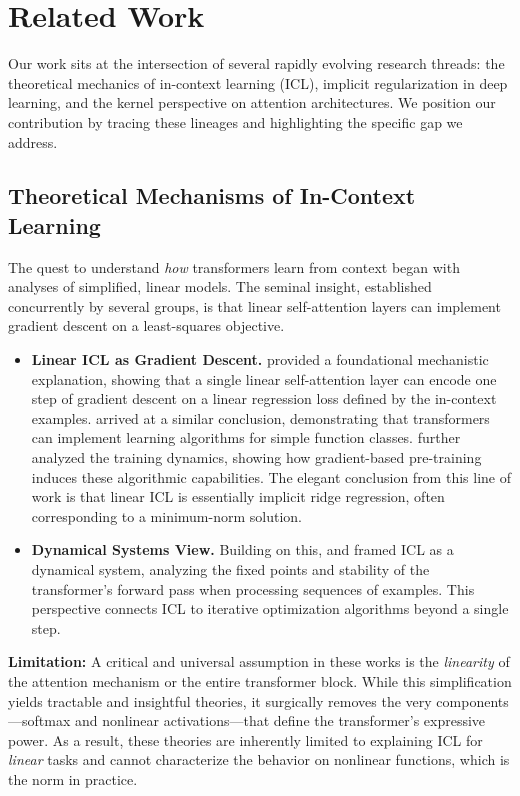 \section{Related Work}
\label{sec:related-work}

Our work sits at the intersection of several rapidly evolving research threads: the theoretical mechanics of in-context learning (ICL), implicit regularization in deep learning, and the kernel perspective on attention architectures. We position our contribution by tracing these lineages and highlighting the specific gap we address.

\subsection{Theoretical Mechanisms of In-Context Learning}
\label{subsec:theory-icl}

The quest to understand \textit{how} transformers learn from context began with analyses of simplified, linear models. The seminal insight, established concurrently by several groups, is that linear self-attention layers can implement gradient descent on a least-squares objective.

\begin{itemize}
	\item \textbf{Linear ICL as Gradient Descent.} \citet{von2023linear} provided a foundational mechanistic explanation, showing that a single linear self-attention layer can encode one step of gradient descent on a linear regression loss defined by the in-context examples. \citet{akyurek2022learning} arrived at a similar conclusion, demonstrating that transformers can implement learning algorithms for simple function classes. \citet{zhang2023trained} further analyzed the training dynamics, showing how gradient-based pre-training induces these algorithmic capabilities. The elegant conclusion from this line of work is that linear ICL is essentially implicit ridge regression, often corresponding to a minimum-norm solution.
	\item \textbf{Dynamical Systems View.} Building on this, \citet{giampaolo2023dynamical} and \citet{bai2024transformers} framed ICL as a dynamical system, analyzing the fixed points and stability of the transformer's forward pass when processing sequences of examples. This perspective connects ICL to iterative optimization algorithms beyond a single step.
\end{itemize}

\textbf{Limitation:} A critical and universal assumption in these works is the \textit{linearity} of the attention mechanism or the entire transformer block. While this simplification yields tractable and insightful theories, it surgically removes the very components—softmax and nonlinear activations—that define the transformer's expressive power. As a result, these theories are inherently limited to explaining ICL for \textit{linear} tasks and cannot characterize the behavior on nonlinear functions, which is the norm in practice.

